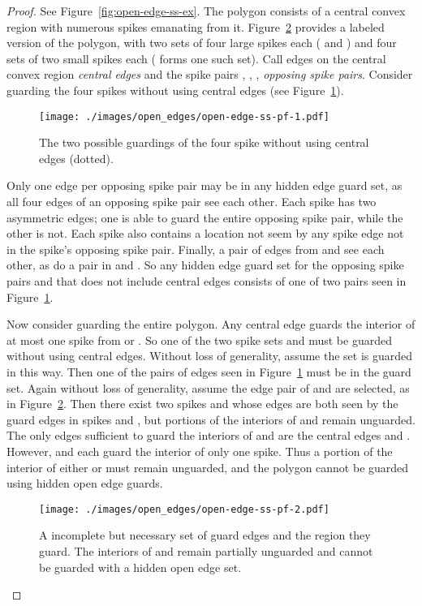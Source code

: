 \documentclass{cccg12}
\begin{document}
\begin{proof}

See Figure~\ref{fig:open-edge-ss-ex}.
The polygon consists of a central convex region with numerous spikes emanating from it.
Figure~\ref{fig:open-edge-ss-pf-2} provides a labeled version of the polygon, with two sets of four large spikes each ( and ) and four sets of two small spikes each ( forms one such set).
Call edges on the central convex region \emph{central edges} and the spike pairs , , ,  \emph{opposing spike pairs}.
Consider guarding the four spikes  without using central edges (see Figure~\ref{fig:open-edge-ss-pf-1}).

\begin{figure}[ht]
\centering
\texttt{[image: ./images/open\_edges/open-edge-ss-pf-1.pdf]}
\caption{The two possible guardings of the four spike  without using central edges (dotted).}
\label{fig:open-edge-ss-pf-1}
\end{figure}

Only one edge per opposing spike pair may be in any hidden edge guard set, as all four edges of an opposing spike pair see each other.
Each spike has two asymmetric edges; one is able to guard the entire opposing spike pair, while the other is not.
Each spike also contains a location not seem by any spike edge not in the spike's opposing spike pair.
Finally, a pair of edges from  and  see each other, as do a pair in  and .
So any hidden edge guard set for the opposing spike pairs  and  that does not include central edges consists of one of two pairs seen in Figure~\ref{fig:open-edge-ss-pf-1}.

Now consider guarding the entire polygon.
Any central edge guards the interior of at most one spike from  or . 
So one of the two spike sets  and  must be guarded without using central edges.
Without loss of generality, assume the  set is guarded in this way.
Then one of the pairs of edges seen in Figure~\ref{fig:open-edge-ss-pf-1} must be in the guard set.
Again without loss of generality, assume the edge pair of  and  are selected, as in Figure~\ref{fig:open-edge-ss-pf-2}.
Then there exist two spikes  and  whose edges are both seen by the guard edges in spikes  and , but portions of the interiors of  and  remain unguarded.
The only edges sufficient to guard the interiors of  and  are the central edges  and .
However,  and  each guard the interior of only one spike.
Thus a portion of the interior of either  or  must remain unguarded, and the polygon cannot be guarded using hidden open edge guards.

\begin{figure}[ht]
\centering
\texttt{[image: ./images/open\_edges/open-edge-ss-pf-2.pdf]}
\caption{A incomplete but necessary set of guard edges and the region they guard. 
The interiors of  and  remain partially unguarded and cannot be guarded with a hidden open edge set.}
\label{fig:open-edge-ss-pf-2}
\end{figure}

\end{proof}
\end{document}
